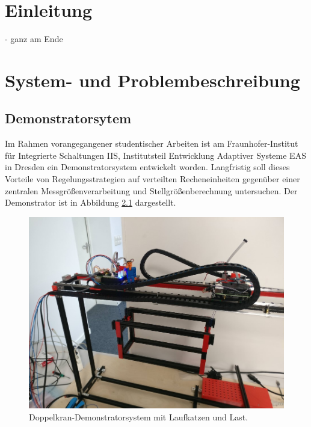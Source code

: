 \pagestyle{scrheadings}

\chapter{Einleitung}
- ganz am Ende

\chapter{System- und Problembeschreibung}

\section{Demonstratorsytem}
Im Rahmen vorangegangener studentischer Arbeiten ist am Fraunhofer-Institut für Integrierte Schaltungen IIS, Institutsteil Entwicklung Adaptiver Systeme EAS \cite{fraunhoferIISEAS} in Dresden ein Demonstratorsystem entwickelt worden. Langfristig soll dieses Vorteile von Regelungsstrategien auf verteilten Recheneinheiten gegenüber einer zentralen Messgrößenverarbeitung und Stellgrößenberechnung untersuchen. Der Demonstrator ist in Abbildung \ref{fig:demonstrator_real} dargestellt.

\begin{figure}[ht]
	\begin{center}
		\includegraphics[scale=1]{Pictures/real_gantry.jpg}
	\end{center}
	\caption[Doppelkran-Demonstratorsystem mit Laufkatzen und Last]
	{Doppelkran-Demonstratorsystem mit Laufkatzen und Last.}
	\label{fig:demonstrator_real}
\end{figure}

